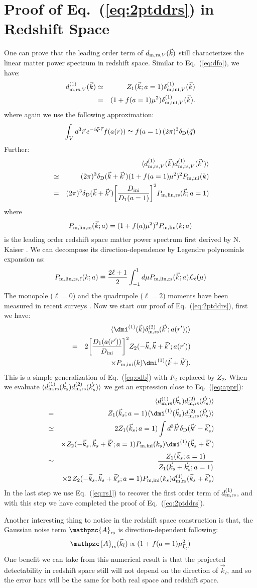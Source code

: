 \documentclass[prd,amsmath,amssymb,floatfix,superscriptaddress,nofootinbib,twocolumn]{revtex4-1}
\def\be{\begin{equation}}
\def\ee{\end{equation}}
\def\bea{\begin{eqnarray}}
\def\eea{\end{eqnarray}}
\newcommand{\rs}{\rm rs}
\newcommand{\ini}{\rm ini}
\newcommand{\vrr}{\vec{r}}
\newcommand{\vs}{\nonumber\\}
\newcommand{\vk}{\vec{k}}
\newcommand{\ec}[1]{Eq.~(\ref{eq:#1})}
\newcommand{\eql}[1]{\label{eq:#1}}
\begin{document}
\section{Proof of \ec{2ptddrs} in Redshift Space} \label{appendb}
One can prove that the leading order term of $d_{{\rm m,rs},V}(\vk)$ still characterizes the linear matter power spectrum in redshift space. Similar to \ec{dfo}, we have:
\bea
d^{( 1)}_{{\rm m,rs},V}(\vk)&\simeq & Z_{1}(\vk;a=1)\delta^{(1)}_{{\rm m,ini},V}(\vk)\vs
&=&(1+f(a=1)\mu^2)\delta^{(1)}_{{\rm m,ini},V}(\vk).\eql{rs1}
\eea
where again we use the following approximation:
\be 
\int_{V} d^{3}\vrr\, e^{-i\vec{q}\cdot\vrr}f(a(r))  \simeq f(a=1)\,(2\pi)^3\delta_{\rm D}(\vec{q})
\ee 
Further:
\bea 
&&\langle d^{( 1)}_{{\rm m,rs},V}(\vk) d^{(1)}_{{\rm m,rs},V}(\vk') \rangle\vs
& \simeq&(2\pi)^3 \delta_{\rm D}(\vk+\vk')(1+f(a=1)\mu^2)^2 P_{\rm m,ini}(k)\vs
&= &(2\pi)^3 \delta_{\rm D}(\vk+\vk')\bigg[ \frac{D_{\ini}}{D_1(a=1)}\bigg]^2 P_{\rm m,lin,rs}(\vk;a=1)\vs \eql{lpsrs}
\eea 
where 
\be 
P_{\rm m,lin,rs}(\vk;a)=(1+f(a)\mu^2)^2 P_{\rm m,lin}(k;a) \eql{kaiser}
\ee 
is the leading order redshift space matter power spectrum first derived by N. Kaiser \cite{Kaiser:1987rsd}. We can decompose its direction-dependence by Legendre polynomials expansion as:
\be 
P_{\rm m,lin,rs,\ell}(k;a)\equiv \frac{2\ell+1}{2}\int_{-1}^{1}d\mu P_{\rm m,lin,rs}(\vk;a) \mathcal{L}_{\ell}(\mu)
\ee 
The monopole ($\ell=0$) and the quadrupole ($\ell=2$) moments have been measured in recent surveys \cite{Gil-Marin:2015sqa}. Now we start our proof of \ec{2ptddrs}, first we have:
\bea 
&&\langle \dmi^{(1)}(\vk)\delta_{\rm m,\rs}^{(2)}(\vk';a(r'))\rangle\vs 
&=&2\bigg[\frac{D_{1}(a(r'))}{D_{\ini}} \bigg]^{2}Z_{2}(-\vk,\vk+\vk';a(r')) \vs
& &\times P_{\rm m,\ini}(k)\dmi^{(1)}(\vk+\vk').\vs
\eea 
This is a simple generalization of \ec{odb} with $F_2$ replaced by $Z_2$. When we evaluate $\langle d_{\rm m,\rs}^{(1)}(\vk_s) d_{\rm m,\rs}^{(2)}(\vk'_s)\rangle$ we get an expression close to \ec{appr}:
\bea 
&& \langle d^{(1)}_{\rm m,\rs}(\vk_s)d^{(2)}_{\rm m,\rs}(\vk_s') \rangle \vs 
&=&  Z_{1}(\vk_s;a=1)\langle \dmi^{(1)}(\vk_s)d^{(2)}_{\rm m,\rs}(\vk_s') \rangle\vs
&\simeq &2Z_{1}(\vk_s;a=1)\int {d^{3}\vk'}\delta_{\rm D}(\vk'-\vk_s') \vs
&&\times Z_{2}(-\vk_s,\vk_s+\vk';a=1)P_{\rm m,\ini}(k_s)\dmi^{(1)}(\vk_s+\vk') \vs
&\simeq & \frac{Z_{1}(\vk_s;a=1 )}{Z_{1}(\vk_s+\vk_s';a=1)} \vs 
&&\times2\,Z_{2}(-\vk_s,\vk_s+\vk_s';a=1) P_{\rm m,\ini}(k_s)d_{\rm m,rs}^{(1)}(\vk_s+\vk_s') \vs\eql{apprrs}
\eea 
In the last step we use \ec{rs1} to recover the first order term of $d_{\rm m,rs}^{(1)}$, and with this step we have completed the proof of \ec{2ptddrs}.

Another interesting thing to notice in the redshift space construction is that, the Gaussian noise term $\mathpzc{A}_{\rs}$ is direction-dependent following:
\be 
\mathpzc{A}_{\rs}(\vk_l)\propto(1+f(a=1)\mu_{\vk_l}^{2})
\ee 
One benefit we can take from this numerical result is that the projected detectability in redshift space still will not depend on the direction of $\vk_l$, and so the error bars will be the same for both real space and redshift space.




\end{document}
